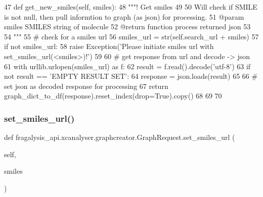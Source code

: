 \begin{DoxyCode}
47     \textcolor{keyword}{def }get\_new\_smiles(self, smiles):
48         \textcolor{stringliteral}{"""! Get smiles }
49 \textcolor{stringliteral}{}
50 \textcolor{stringliteral}{        Will check if SMILE is not null, then pull informtion to graph (as json) for processing.}
51 \textcolor{stringliteral}{        @param smiles SMILES string of molecule}
52 \textcolor{stringliteral}{        @return function process returned json }
53 \textcolor{stringliteral}{}
54 \textcolor{stringliteral}{        """}
55         \textcolor{comment}{# check for a smiles url}
56         smiles\_url = str(self.search\_url + smiles)
57         \textcolor{keywordflow}{if} \textcolor{keywordflow}{not} smiles\_url:
58             \textcolor{keywordflow}{raise} Exception(\textcolor{stringliteral}{'Please initiate smiles url with set\_smiles\_url(<smiles>)!'})
59 
60         \textcolor{comment}{# get response from url and decode -> json}
61         with urllib.urlopen(smiles\_url) \textcolor{keyword}{as} f:
62             result = f.read().decode(\textcolor{stringliteral}{'utf-8'})
63             \textcolor{keywordflow}{if} \textcolor{keywordflow}{not} result == \textcolor{stringliteral}{'EMPTY RESULT SET'}:
64                 response = json.loads(result)
65 
66                 \textcolor{comment}{# set json as decoded response for processing}
67                 \textcolor{keywordflow}{return} graph\_dict\_to\_df(response).reset\_index(drop=\textcolor{keyword}{True}).copy()
68 
69 
70 
\end{DoxyCode}
\mbox{\label{classfragalysis__api_1_1xcanalyser_1_1graphcreator_1_1_graph_request_ac47f4baba7c0cdefd43bb0c7e17646c9}} 
\subsubsection{\texorpdfstring{set\+\_\+smiles\+\_\+url()}{set\_smiles\_url()}}
{\footnotesize\ttfamily def fragalysis\+\_\+api.\+xcanalyser.\+graphcreator.\+Graph\+Request.\+set\+\_\+smiles\+\_\+url (\begin{DoxyParamCaption}\item[{}]{self,  }\item[{}]{smiles }\end{DoxyParamCaption})}



